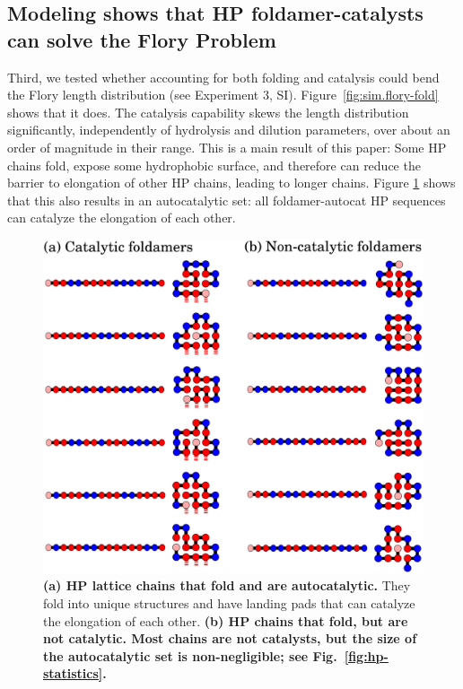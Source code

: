 \documentclass[journal=jacsat,manuscript=article,layout=twocolumn]{achemso}
\begin{document}
\subsection{Modeling shows that HP foldamer-catalysts can solve the Flory Problem}

Third, we tested whether accounting for both folding and catalysis could bend the Flory length 
distribution (see Experiment 3, SI).  Figure~\ref{fig:sim.flory-fold} shows that it does.  The 
catalysis capability skews the length distribution significantly, independently of hydrolysis and 
dilution parameters, over about an order of magnitude in their range.  This is a main result of this 
paper:  Some HP chains fold, expose some hydrophobic surface, and therefore can reduce the barrier 
to elongation of other HP chains, leading to longer chains.  Figure \ref{fig:fold-cat} shows that 
this also results in an autocatalytic set: all foldamer-autocat HP sequences can catalyze the 
elongation of each other.

\begin{figure}[htb!]
  \centering
  \includegraphics[width=\columnwidth]{pictures/fold-cat.pdf} 
  \caption{\footnotesize{\textbf{(a) HP lattice chains that fold and are autocatalytic.}  They fold 
into unique structures and have landing pads that can catalyze the elongation of each other.  
\bf{(b) HP chains that fold, but are not catalytic.}  Most chains are not catalysts, but the size of 
the autocatalytic set is non-negligible; see Fig.~\ref{fig:hp-statistics}.}}
  \label{fig:fold-cat}
\end{figure}
\end{document}
